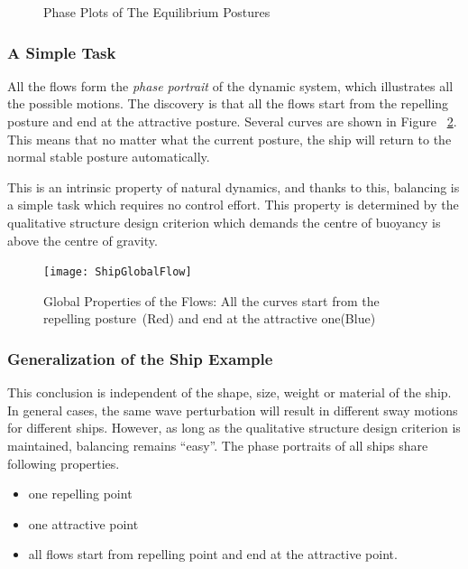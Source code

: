 \begin{figure}[h]
\begin{center}
\end{center}
\caption{Phase Plots of The Equilibrium Postures}
\label{fig:eqposture}
\end{figure}





\subsubsection*{A Simple Task}
All the flows form the \emph{phase portrait} of the dynamic system, which illustrates all the possible motions. 
The discovery is that all the flows start from the repelling posture and end at the attractive posture.
Several curves are shown in Figure ~\ref{fig:globalflow}.
This means that no matter what the current posture, the ship will return to the normal stable posture automatically.

This is an intrinsic property of natural dynamics, and thanks to this, balancing is a simple task which requires no control effort. 
This property is determined by the qualitative structure design criterion which demands the centre of buoyancy  is above the centre of gravity.

\begin{figure}[!htbp]
  \begin{center}
   \texttt{[image: ShipGlobalFlow]}
   \caption{Global Properties of the Flows: All the curves start from the repelling posture~(Red) and end at the attractive one(Blue)}
   \label{fig:globalflow}
  \end{center}
\end{figure}

 



\subsubsection*{Generalization of the Ship Example} 
This conclusion is independent of the shape, size, weight or material of the ship. 
In general cases, the same wave perturbation will result in different sway motions for different ships.
However, as long as the qualitative structure design criterion is maintained, balancing remains ``easy''.
The phase portraits of all  ships share following properties. 
\begin{itemize}
\item one repelling point 
\item one attractive point 
\item all flows start from repelling point and end at the  attractive point. 
\end{itemize}


